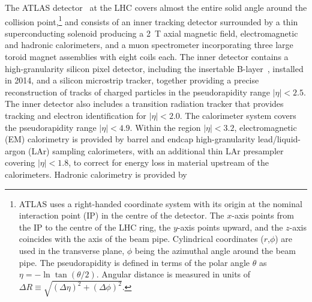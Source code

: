 \documentclass[PAPER, coverpage, atlasdraft=true, texlive=2016, UKenglish]{\ATLASLATEXPATH atlasdoc}
\begin{document}
The ATLAS detector~\cite{PERF-2007-01} at the LHC covers almost the entire solid angle around the collision point,\footnote{ATLAS 
uses a right-handed coordinate system with its origin at the nominal interaction point (IP) in the 
centre of the detector.  
The $x$-axis points from
the IP to the centre of the LHC ring, %
the $y$-axis points upward,
and the $z$-axis coincides with the axis of the beam pipe.
Cylindrical coordinates ($r$,$\phi$) are used 
in the transverse plane, $\phi$ being the azimuthal angle around the beam pipe. The pseudorapidity is defined in 
terms of the polar angle $\theta$ as $\eta = - \ln \tan(\theta/2)$.
Angular distance is measured in units of $\Delta R\equiv \sqrt{(\Delta\eta)^2+(\Delta\phi)^2}$.} and consists of an inner tracking detector surrounded by a thin superconducting solenoid producing a
2~T axial magnetic field, electromagnetic and hadronic calorimeters, and a muon spectrometer incorporating three large toroid magnet assemblies with eight coils each. The inner detector contains a high-granularity silicon pixel detector, including the %
insertable B-layer~\cite{IBL1,IBL2,Abbott:2018ikt}, installed in 2014, and a silicon microstrip tracker, together providing a precise reconstruction of tracks of charged particles in the pseudorapidity range $|\eta|<2.5$.
The inner detector also includes a transition radiation tracker that provides tracking and electron identification for $|\eta|<2.0$.
The calorimeter system covers the pseudorapidity range $|\eta| < 4.9$. Within the region $|\eta|< 3.2$, electromagnetic (EM) calorimetry is provided by barrel and endcap high-granularity lead/liquid-argon (LAr) sampling calorimeters, with an additional thin LAr presampler covering $|\eta| < 1.8$, to correct for energy loss in material upstream of the calorimeters. Hadronic calorimetry is provided by %
\end{document}
